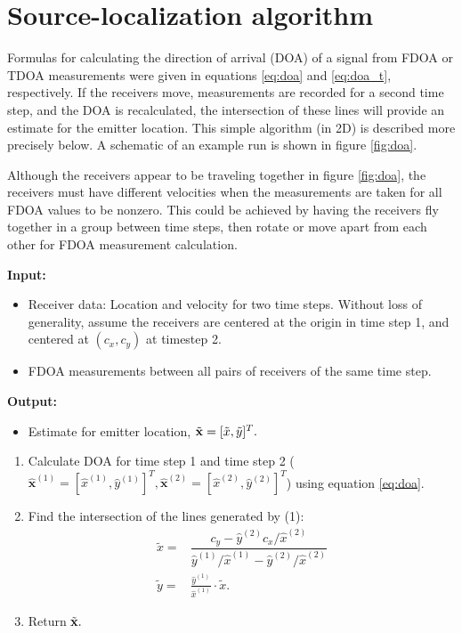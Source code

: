 \section{Source-localization algorithm}
\label{s:algorithm}
Formulas for calculating the direction of arrival (DOA) of a signal from FDOA or TDOA measurements were given in equations \ref{eq:doa} and \ref{eq:doa_t}, respectively. If the receivers move, measurements are recorded for a second time step, and the DOA is recalculated, the intersection of these lines will provide an estimate for the emitter location. This simple algorithm (in 2D) is described more precisely below. A schematic of an example run is shown in figure \ref{fig:doa}.

Although the receivers appear to be traveling together in figure \ref{fig:doa}, the receivers must have different velocities when the measurements are taken for all FDOA values to be nonzero. This could be achieved by having the receivers fly together in a group between time steps, then rotate or move apart from each other for FDOA measurement calculation.  

\begin{framed}
\noindent\textbf{Input:}
\begin{itemize}
  \item Receiver data: Location and velocity for two time steps. Without loss of generality, assume the receivers are centered at the origin in time step 1, and centered at $(c_x,c_y)$ at timestep 2.
  \item FDOA measurements between all pairs of receivers of the same time step.
\end{itemize}
\textbf{Output:}
\begin{itemize}
  \item Estimate for emitter location, $\tilde{\mathbf{x}}=[\tilde{x},\tilde{y}]^T.$
\end{itemize}
\vspace{1ex}
\begin{enumerate}
  \item Calculate DOA for time step 1 and time step 2 ($\hat{\mathbf{x}}^{(1)}=[\hat{x}^{(1)},\hat{y}^{(1)}]^T,\hat{\mathbf{x}}^{(2)}=[\hat{x}^{(2)},\hat{y}^{(2)}]^T$) using equation \ref{eq:doa}.
  \item Find the intersection of the lines generated by (1):
  \begin{align*}
    \tilde{x} =& \dfrac{c_y - \hat{y}^{(2)}c_x/\hat{x}^{(2)}}{\hat{y}^{(1)}/\hat{x}^{(1)}-\hat{y}^{(2)}/\hat{x}^{(2)}} \\
    \tilde{y} =& \frac{\hat{y}^{(1)}}{\hat{x}^{(1)}}\cdot\tilde{x}.
  \end{align*}
  \item Return $\tilde{\mathbf{x}}.$
\end{enumerate}
\end{framed}


